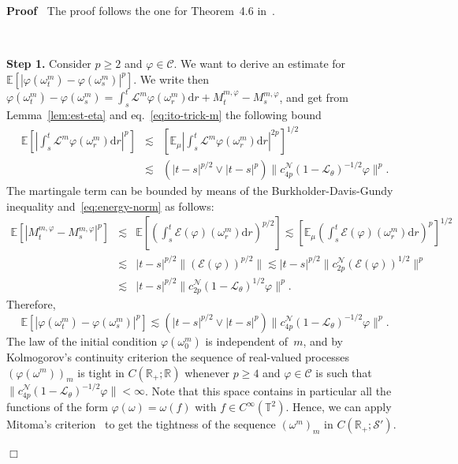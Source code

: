 \documentclass[10pt]{article}
\newcommand{\mathd}{\mathrm{d}}
\newcommand{\tmtextbf}[1]{{\bfseries{#1}}}
\newenvironment{proof}{\noindent\textbf{Proof\ }}{\hspace*{\fill}$\Box$\medskip}
\begin{document}
\begin{proof}
  The proof follows the one for Theorem~4.6
  in~{\cite{gubinelli2018infinitesimal}}.
  
  \
  
  \tmtextbf{Step 1.} Consider $p \geqslant 2$ and $\varphi \in \mathcal{C}$.
  We want to derive an estimate for $\mathbb{E} [| \varphi (\omega^m_t) -
  \varphi (\omega_s^m) |^p]$. We write then $\varphi (\omega^m_t) - \varphi
  (\omega_s^m) = \int_s^t \mathcal{L}^m \varphi (\omega^m_r) \mathd r +
  M_t^{m, \varphi} - M_s^{m, \varphi}$, and get from Lemma~\ref{lem:est-eta}
  and eq.~{\eqref{eq:ito-trick-m}} the following bound
  \[ \begin{array}{lll}
       \mathbb{E} \left[ \left| \int_s^t \mathcal{L}^m \varphi (\omega^m_r)
       \mathd r \right|^p \right] & \lesssim & \left[ \mathbb{E}_{\mu} \left|
       \int_s^t \mathcal{L}^m \varphi (\omega_r^m) \mathd r \right|^{2 p}
       \right]^{1 / 2}\\
       & \lesssim & (| t - s |^{p / 2} \vee | t - s |^p) \| c_{4
       p}^{\mathcal{N}} (1 -\mathcal{L}_{\theta})^{- 1 / 2} \varphi \|^p .
     \end{array} \]
  The martingale term can be bounded by means of the Burkholder-Davis-Gundy
  inequality and~{\eqref{eq:energy-norm}} as follows:
  \[ \begin{array}{lll}
       \mathbb{E} [| M_t^{m, \varphi} - M_s^{m, \varphi} |^p] & \lesssim &
       \mathbb{E} \left[ \left( \int_s^t \mathcal{E} (\varphi) (\omega^m_r)
       \mathd r \right)^{p / 2} \right] \lesssim \left[ \mathbb{E}_{\mu}
       \left( \int_s^t \mathcal{E} (\varphi) (\omega_r^m) \mathd r \right)^p
       \right]^{1 / 2}\\
       & \lesssim & | t - s |^{p / 2} \| (\mathcal{E} (\varphi))^{p / 2} \|
       \lesssim | t - s |^{p / 2} \| c_{2 p}^{\mathcal{N}} (\mathcal{E}
       (\varphi))^{1 / 2} \|^p\\
       & \lesssim & | t - s |^{p / 2} \| c_{2 p}^{\mathcal{N}} (1
       -\mathcal{L}_{\theta})^{1 / 2} \varphi \|^p .
     \end{array} \]
  Therefore,
  \begin{equation}
    \mathbb{E} [| \varphi (\omega_t^m) - \varphi (\omega_s^m) |^p] \lesssim (|
    t - s |^{p / 2} \vee | t - s |^p) \| c_{4 p}^{\mathcal{N}} (1
    -\mathcal{L}_{\theta})^{- 1 / 2} \varphi \|^p . \label{eq:bd-tightness}
  \end{equation}
  The law of the initial condition $\varphi (\omega_0^m)$ is independent
  of~$m$, and by Kolmogorov's continuity criterion the sequence of real-valued
  processes $(\varphi (\omega^m))_m$ is tight in $C (\mathbb{R}_+ ;
  \mathbb{R})$ whenever $p \geqslant 4$ and $\varphi \in \mathcal{C}$ is such
  that $\| c_{4 p}^{\mathcal{N}} (1 -\mathcal{L}_{\theta})^{- 1 / 2} \varphi
  \| < \infty$. Note that this space contains in particular all the functions
  of the form $\varphi (\omega) = \omega (f)$ with $f \in C^{\infty}
  (\mathbb{T}^2)$. Hence, we can apply Mitoma's criterion~{\cite{Mitoma1983}}
  to get the tightness of the sequence $(\omega^m)_m$ in $C (\mathbb{R}_+ ;
  \mathcal{S}')$.
  

\end{proof}
\end{document}
